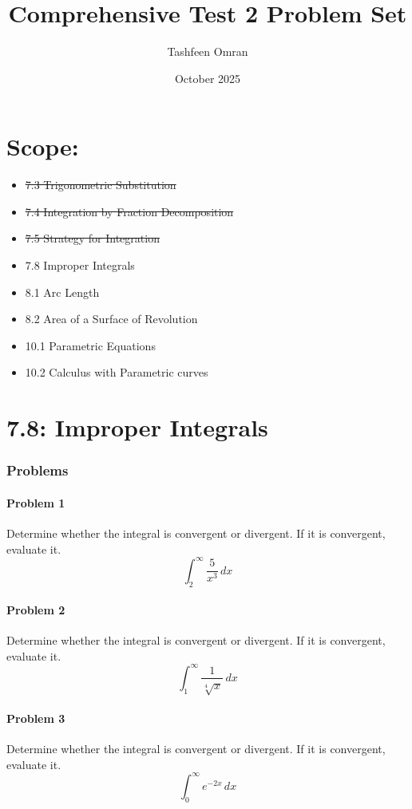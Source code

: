 \documentclass{article}
\title{Comprehensive Test 2 Problem Set}
\author{Tashfeen Omran}
\date{October 2025}
\begin{document}
\maketitle

\part*{Scope:}

\begin{itemize}
    \item \sout{7.3 Trigonometric Substitution}
    \item \sout{7.4 Integration by Fraction Decomposition}
    \item \sout{7.5 Strategy for Integration}
    \item 7.8 Improper Integrals
    \item 8.1 Arc Length
    \item 8.2 Area of a Surface of Revolution
    \item 10.1 Parametric Equations
    \item 10.2 Calculus with Parametric curves
\end{itemize}
    


\part*{7.8: Improper Integrals}

\section*{Problems}

\subsection*{Problem 1}
Determine whether the integral is convergent or divergent. If it is convergent, evaluate it.
\[ \int_{2}^{\infty} \frac{5}{x^3} \,dx \]

\subsection*{Problem 2}
Determine whether the integral is convergent or divergent. If it is convergent, evaluate it.
\[ \int_{1}^{\infty} \frac{1}{\sqrt[4]{x}} \,dx \]

\subsection*{Problem 3}
Determine whether the integral is convergent or divergent. If it is convergent, evaluate it.
\[ \int_{0}^{\infty} e^{-2x} \,dx \]
\end{document}
